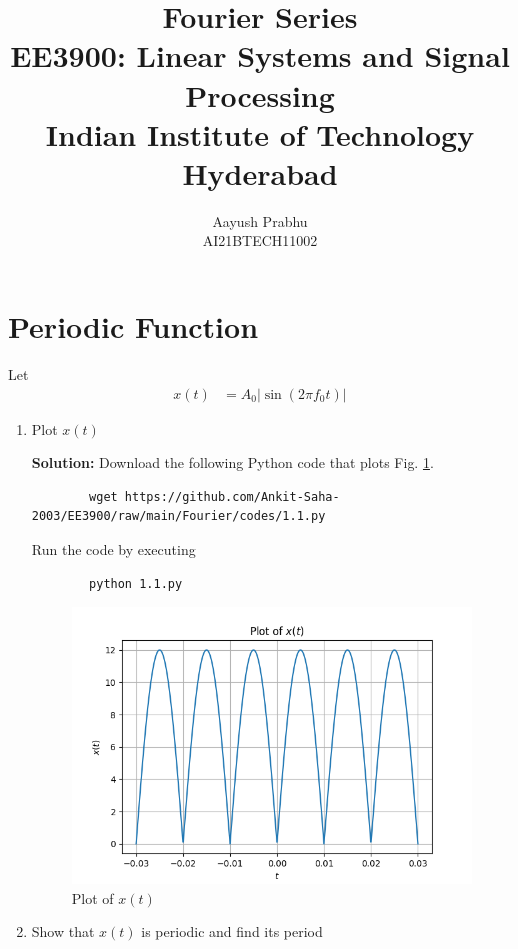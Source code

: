 \documentclass[journal,12pt,twocolumn]{IEEEtran}
\title{Fourier Series \\ \Large EE3900: Linear Systems and Signal Processing \\ \large Indian Institute of Technology Hyderabad}
\author{Aayush Prabhu \\ \normalsize AI21BTECH11002}
\newcommand{\solution}{\noindent \textbf{Solution: }}
\providecommand{\brak}[1]{\ensuremath{\left(#1\right)}}
\providecommand{\abs}[1]{\left\vert#1\right\vert}
\numberwithin{equation}{section}
\numberwithin{figure}{section}
\renewcommand\thesection{\arabic{section}}
\begin{document}
	\maketitle

	\section{Periodic Function}
	Let 
	\begin{align}
		x(t) &= A_0\abs{\sin\brak{2\pi f_0 t}}
		\label{eq:10-orig-diff-def}
	\end{align}

	\begin{enumerate}[label=\thesection.\arabic*,ref=\thesection.\theenumi]
	\item Plot $x(t)$
	
	\solution Download the following Python code that plots Fig. \ref{fig-1.1}.
	\begin{lstlisting}
		wget https://github.com/Ankit-Saha-2003/EE3900/raw/main/Fourier/codes/1.1.py
	\end{lstlisting}
	
	Run the code by executing
	\begin{lstlisting}
		python 1.1.py
	\end{lstlisting}

	\begin{figure}[!ht]
		\centering
		\includegraphics[width=\columnwidth]{./figs/1.1.png}
		\caption{Plot of $x(t)$}
		\label{fig-1.1}	
	\end{figure}
	
	\item Show that $x(t)$ is periodic and find its period
	

\end{enumerate}
\end{document}
